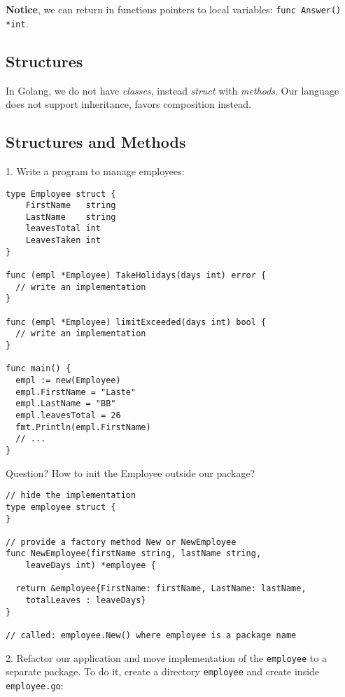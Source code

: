 \documentclass[11pt, letterpaper]{article}
\begin{document}
\textbf{Notice}, we can return in functions pointers to local variables: \texttt{func Answer() *int}.

\subsection{Structures}

In Golang, we do not have \emph{classes}, instead \emph{struct} with \emph{methods}. Our language does not support inheritance, favors composition instead. 

\subsection{Structures and Methods}

1. Write a program to manage employees:

\begin{verbatim}
type Employee struct {  
    FirstName   string
    LastName    string
    leavesTotal int
    LeavesTaken int
}

func (empl *Employee) TakeHolidays(days int) error {
  // write an implementation
} 

func (empl *Employee) limitExceeded(days int) bool {
  // write an implementation
}

func main() {
  empl := new(Employee)
  empl.FirstName = "Laste"
  empl.LastName = "BB"
  empl.leavesTotal = 26
  fmt.Println(empl.FirstName)
  // ...
}
\end{verbatim}

\bigskip

Question? How to init the Employee outside our package?

\begin{verbatim}
// hide the implementation
type employee struct {  
}

// provide a factory method New or NewEmployee
func NewEmployee(firstName string, lastName string,
    leaveDays int) *employee {
  
  return &employee{FirstName: firstName, LastName: lastName,
    totalLeaves : leaveDays}
}

// called: employee.New() where employee is a package name 
\end{verbatim}

\bigskip

2. Refactor our application and move implementation of the \verb|employee| to a separate package. To do it, create a directory \verb|employee| and create inside \verb|employee.go|:
\end{document}
